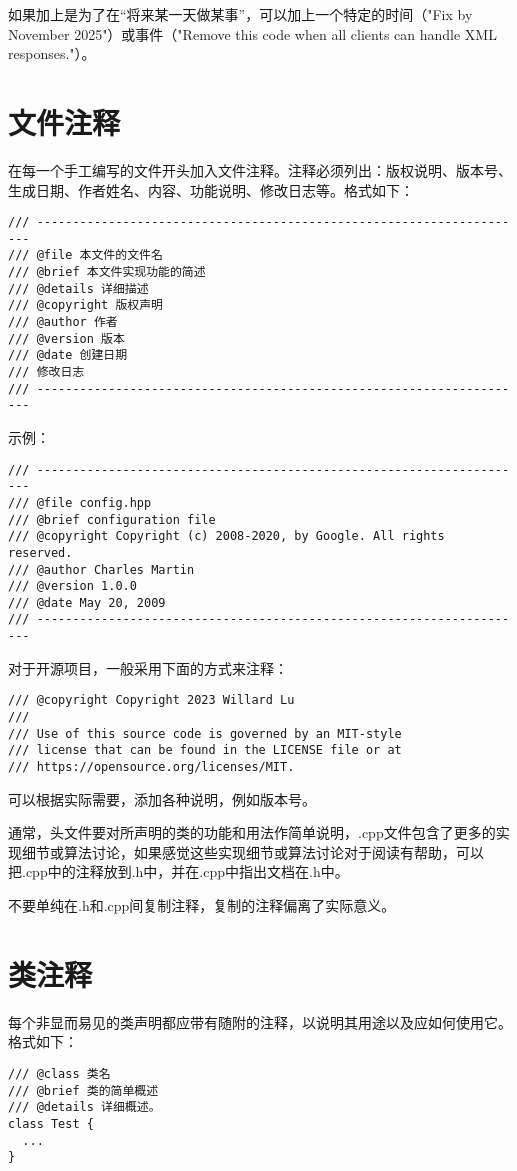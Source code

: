如果加上是为了在“将来某一天做某事”，可以加上一个特定的时间（"Fix by November 2025"）或事件（"Remove this code when all clients can handle XML responses."）。


\section{文件注释}
在每一个手工编写的文件开头加入文件注释。注释必须列出：版权说明、版本号、生成日期、作者姓名、内容、功能说明、修改日志等。格式如下：
\begin{verbatim}
/// ---------------------------------------------------------------------
/// @file 本文件的文件名
/// @brief 本文件实现功能的简述
/// @details 详细描述
/// @copyright 版权声明
/// @author 作者
/// @version 版本
/// @date 创建日期
/// 修改日志
/// ---------------------------------------------------------------------
\end{verbatim}

示例：
\begin{verbatim}
/// ---------------------------------------------------------------------
/// @file config.hpp
/// @brief configuration file
/// @copyright Copyright (c) 2008-2020, by Google. All rights reserved.
/// @author Charles Martin
/// @version 1.0.0
/// @date May 20, 2009
/// ---------------------------------------------------------------------
\end{verbatim}

对于开源项目，一般采用下面的方式来注释：
\begin{verbatim}
/// @copyright Copyright 2023 Willard Lu
///
/// Use of this source code is governed by an MIT-style
/// license that can be found in the LICENSE file or at
/// https://opensource.org/licenses/MIT.
\end{verbatim}
可以根据实际需要，添加各种说明，例如版本号。

通常，头文件要对所声明的类的功能和用法作简单说明，.cpp文件包含了更多的实现细节或算法讨论，如果感觉这些实现细节或算法讨论对于阅读有帮助，可以把.cpp中的注释放到.h中，并在.cpp中指出文档在.h中。

不要单纯在.h和.cpp间复制注释，复制的注释偏离了实际意义。


\section{类注释}
每个非显而易见的类声明都应带有随附的注释，以说明其用途以及应如何使用它。格式如下：
\begin{verbatim}
/// @class 类名
/// @brief 类的简单概述
/// @details 详细概述。
class Test {
  ...
}
\end{verbatim}

